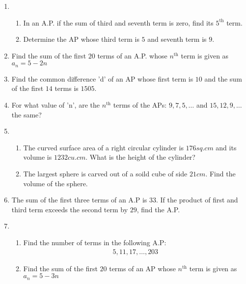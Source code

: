 \begin{enumerate}
    \item 
    \begin{enumerate}
        \item In an A.P. if the sum of third and seventh term is zero, find its $5^{\text{th}}$ term.
        
        \item Determine the AP whose third term is $5$ and seventh term is $9$.
        \end{enumerate}

    
        \item Find the sum of the first $20$ terms of an A.P. whose $n^{\text{th}}$ term is given as $a_n=5-2n$
    
    
        \item Find the common difference 'd' of an AP whose first term is $10$ and the sum of the first $14$ terms is $1505$.

        \item For what value of 'n', are the $n^{\text{th}}$ terms of the APs: $9,7,5,\dots$ and $15,12,9,\dots$ the same?

        \item
        \begin{enumerate}
            \item The curved surface area of a right circular cylinder is $176 sq.cm$ and its volume is $1232cu. cm$. What is the height of the cylinder?
            
        \item The largest sphere is carved out of a soild cube of side $21 cm$. Find the volume of the sphere.
        \end{enumerate}
        \item The sum of the first three terms of an A.P is $33$. If the product of first and third term exceeds the second term by $29$, find the A.P.
            
         \item
        \begin{enumerate}
            \item Find the number of terms in the following A.P:
            \begin{align}
                5,11,17,\dots,203
            \end{align}
 \item Find the sum of the first $20$ terms of an AP whose $n^{\text{th}}$ term is given as $a_n=5-3n$
        \end{enumerate}


\end{enumerate}
